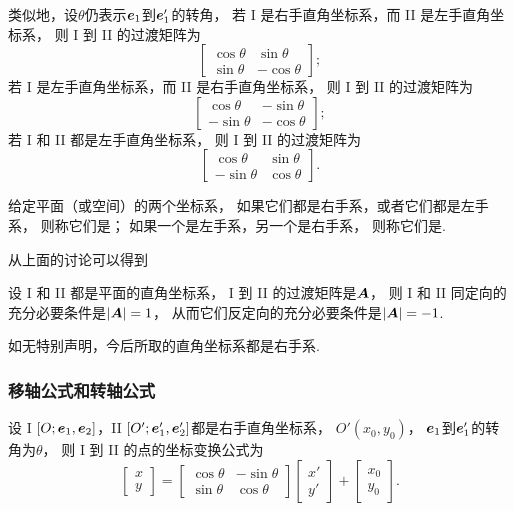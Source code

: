 类似地，设\(\theta\)仍表示\(\boldsymbol{e}_1\)到\(\boldsymbol{e}_1'\)的转角，
若 I 是右手直角坐标系，而 II 是左手直角坐标系，
则 I 到 II 的过渡矩阵为\[
	\begin{bmatrix}
		\cos\theta & \sin\theta \\
		\sin\theta & -\cos\theta
	\end{bmatrix};
\]
若 I 是左手直角坐标系，而 II 是右手直角坐标系，
则 I 到 II 的过渡矩阵为\[
	\begin{bmatrix}
		\cos\theta & -\sin\theta \\
		-\sin\theta & -\cos\theta
	\end{bmatrix};
\]
若 I 和 II 都是左手直角坐标系，
则 I 到 II 的过渡矩阵为\[
	\begin{bmatrix}
		\cos\theta & \sin\theta \\
		-\sin\theta & \cos\theta
	\end{bmatrix}.
\]

\begin{definition}
给定平面（或空间）的两个坐标系，
如果它们都是右手系，或者它们都是左手系，
则称它们是；
如果一个是左手系，另一个是右手系，
则称它们是.
\end{definition}

从上面的讨论可以得到
\begin{theorem}
设 I 和 II 都是平面的直角坐标系，
I 到 II 的过渡矩阵是\(\boldsymbol{A}\)，
则 I 和 II 同定向的充分必要条件是\(\abs{\boldsymbol{A}}=1\)，
从而它们反定向的充分必要条件是\(\abs{\boldsymbol{A}}=-1\).
\end{theorem}

如无特别声明，今后所取的直角坐标系都是右手系.

\subsubsection{移轴公式和转轴公式}
设 I \([O;\boldsymbol{e}_1,\boldsymbol{e}_2]\)，II \([O';\boldsymbol{e}_1',\boldsymbol{e}_2']\)都是右手直角坐标系，
\(O'(x_0,y_0)\)，
\(\boldsymbol{e}_1\)到\(\boldsymbol{e}_1'\)的转角为\(\theta\)，
则 I 到 II 的点的坐标变换公式为
\begin{equation}\label{equation:解析几何.平面坐标系的点的右手直角坐标变换公式I到II.矩阵形式1}
	\begin{bmatrix}
		x \\ y
	\end{bmatrix} = \begin{bmatrix}
		\cos\theta & -\sin\theta \\
		\sin\theta & \cos\theta
	\end{bmatrix} \begin{bmatrix}
		x' \\ y'
	\end{bmatrix} + \begin{bmatrix}
		x_0 \\ y_0
	\end{bmatrix}.
\end{equation}

